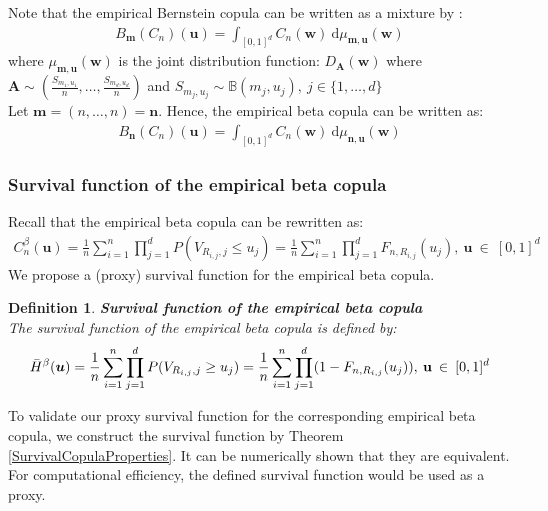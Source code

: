 \documentclass[12pt]{report}
\newtheorem{definition}{Definition}[subsection]
\newcommand{\1}{\mathbf{1}}
\begin{document}
\begin{flushleft}
Note that the empirical Bernstein copula can be written as a mixture by \cite{SegersEBC}: 
\begin{align*}
B_{\boldsymbol{m}}(C_{n})(\boldsymbol{u}) = \int_{[0,1]^d} C_{n}(\boldsymbol{w})  \: \mathrm{d}\mu_{\boldsymbol{m},\boldsymbol{u}}(\boldsymbol{w})  
\end{align*}
where $\mu_{\boldsymbol{m},\boldsymbol{u}}(\boldsymbol{w})$ is the joint distribution function: $D_{\boldsymbol{A}}(\boldsymbol{w})$ where $\boldsymbol{A} \sim \left(\frac{S_{m_{1},u_{1}}}{n}, \dots, \frac{S_{m_{d},u_{d}}}{n}\right)$ and $S_{m_{j},u_{j}} \sim \mathbb{B}(m_{j},u_{j}), \: j \in \{1, \dots, d \}$ \\
\vspace{0.5cm}
Let $\boldsymbol{m} = (n, \dots, n) = \boldsymbol{n}$. Hence, the empirical beta copula can be written as:
\begin{align*}
B_{\boldsymbol{n}}(C_{n})(\boldsymbol{u}) = \int_{[0,1]^d} C_{n}(\boldsymbol{w})  \: \mathrm{d}\mu_{\boldsymbol{n},\boldsymbol{u}}(\boldsymbol{w})  
\end{align*}

\subsubsection{Survival function of the empirical beta copula}

Recall that the empirical beta copula can be rewritten as:
\begin{align*}
C^{\beta}_{n}(\boldsymbol{u}) = \frac{1}{n} \sum\limits_{i = 1}^{n} \prod\limits_{j = 1}^{d} P(V_{R_{i,j},j} \le u_{j}) = \frac{1}{n} \sum\limits_{i = 1}^{n} \prod\limits_{j = 1}^{d} F_{n,R_{i,j}}(u_{j}), \: \boldsymbol{u} \: \in \: [0,1]^{d}
\end{align*}
We propose a (proxy) survival function for the empirical beta copula.
\begin{definition}\label{SurvivalEBC}
\textbf{Survival function of the empirical beta copula} \\
The survival function of the empirical beta copula is defined by:
\begin{align*}
\Bar{H}^{\beta}(\boldsymbol{u}) = \frac{1}{n} \sum\limits_{i = 1}^{n} \prod\limits_{j = 1}^{d} P(V_{R_{i,j},j} \ge u_{j}) = \frac{1}{n} \sum\limits_{i = 1}^{n} \prod\limits_{j = 1}^{d} (1 - F_{n,R_{i,j}}(u_{j})), \: \textbf{u} \: \in \: [0,1]^{d}
\end{align*}
\end{definition}
To validate our proxy survival function for the corresponding empirical beta copula, we construct the survival function by Theorem \ref{SurvivalCopulaProperties}. It can be numerically shown that they are equivalent. For computational efficiency, the defined survival function would be used as a proxy.


\end{flushleft}
\end{document}

